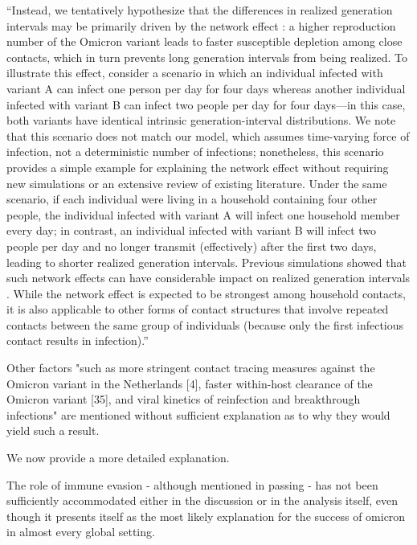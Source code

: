 \documentclass[12pt]{article}
\newcommand{\revtext}{\textsf}
\begin{document}
``Instead, we tentatively hypothesize that the differences in realized generation intervals may be primarily driven by the network effect \citep{park2020inferring,hart2022generation}: a higher reproduction number of the Omicron variant leads to faster susceptible depletion among close contacts, which in turn prevents long generation intervals from being realized. 
To illustrate this effect, consider a scenario in which an individual infected with variant A can infect one person per day for four days whereas another individual infected with variant B can infect two people per day for four days---in this case, both variants have identical intrinsic generation-interval distributions.
We note that this scenario does not match our model, which assumes time-varying force of infection, not a deterministic number of infections; nonetheless, this scenario provides a simple example for explaining the network effect without requiring new simulations or an extensive review of existing literature.
Under the same scenario, if each individual were living in a household containing four other people, the individual infected with variant A will infect one household member every day; in contrast, an individual infected with variant B will infect two people per day and no longer transmit (effectively) after the first two days, leading to shorter realized generation intervals.
Previous simulations showed that such network effects can have considerable impact on realized generation intervals \citep{park2020inferring}.
While the network effect is expected to be strongest among household contacts, it is also applicable to other forms of contact structures that involve repeated contacts between the same group of individuals (because only the first infectious contact results in infection).''

\revtext{Other factors "such as more stringent contact tracing measures against the Omicron variant in the Netherlands [4], faster within-host clearance of the Omicron variant [35], and viral kinetics of reinfection and breakthrough infections" are mentioned without sufficient explanation as to why they would yield such a result.}

We now provide a more detailed explanation.

\revtext{The role of immune evasion - although mentioned in passing - has not been sufficiently accommodated either in the discussion or in the analysis itself, even though it presents itself as the most likely explanation for the success of omicron in almost every global setting.}
\end{document}
